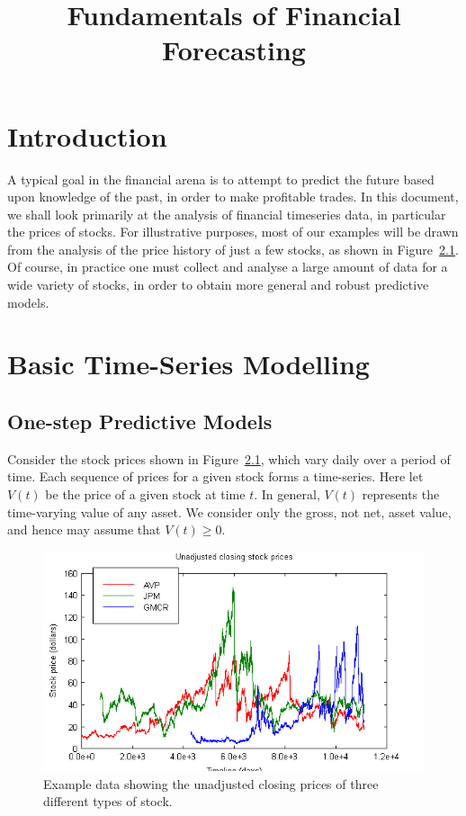 \documentclass[a4paper]{book}
\title{Fundamentals of Financial Forecasting}
\begin{document}
\chapter{Introduction}
A typical goal in the financial arena is to attempt to predict the future based upon knowledge of the past, in order to make profitable trades.
In this document, we shall look primarily at the analysis of financial timeseries data, in particular the prices of stocks.
For illustrative purposes, most of our examples will be drawn from the analysis of the price history of just a few stocks, as shown
in Figure~\ref{fig:stock-prices}. Of course, in practice one must collect and analyse a large amount of data for a wide variety of stocks, 
in order to obtain more general and robust predictive models.

\chapter{Basic Time-Series Modelling}
\section{One-step Predictive Models}
Consider the stock prices shown in Figure~\ref{fig:stock-prices},
which vary daily over a period of time.
Each sequence of prices for a given stock forms a time-series.
Here let $V(t)$ be the price of a given stock at time $t$. In general,
$V(t)$ represents the time-varying value of any asset. We
consider only the gross, not net, asset value, and hence may assume that $V(t)\ge 0$.
\begin{figure}[hbt]
\includegraphics[scale=0.8]{figures/stock-prices-close.png}
\caption{Example data showing the unadjusted closing prices of three different
types of stock.}
\label{fig:stock-prices}
\end{figure}
\end{document}
